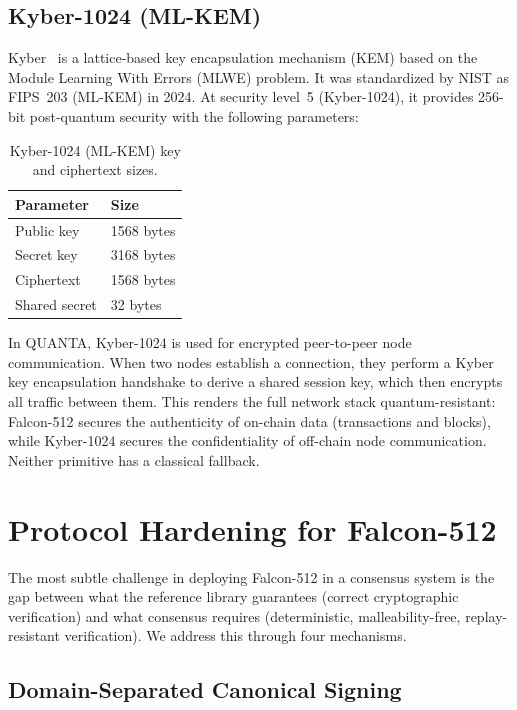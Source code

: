 \documentclass[11pt,a4paper]{article}
\begin{document}
\subsection{Kyber-1024 (ML-KEM)}
\label{subsec:kyber}

Kyber~\cite{fips203} is a lattice-based key encapsulation mechanism (KEM)
based on the Module Learning With Errors (MLWE) problem. It was standardized
by NIST as FIPS~203 (ML-KEM) in 2024. At security level~5 (Kyber-1024),
it provides 256-bit post-quantum security with the following parameters:

\begin{table}[h]
\centering
\begin{tabular}{@{}ll@{}}
\toprule
\textbf{Parameter} & \textbf{Size} \\
\midrule
Public key  & 1568 bytes \\
Secret key  & 3168 bytes \\
Ciphertext  & 1568 bytes \\
Shared secret & 32 bytes \\
\bottomrule
\end{tabular}
\caption{Kyber-1024 (ML-KEM) key and ciphertext sizes.}
\end{table}

In QUANTA, Kyber-1024 is used for encrypted peer-to-peer node communication.
When two nodes establish a connection, they perform a Kyber key encapsulation
handshake to derive a shared session key, which then encrypts all traffic
between them. This renders the full network stack quantum-resistant: Falcon-512
secures the authenticity of on-chain data (transactions and blocks), while
Kyber-1024 secures the confidentiality of off-chain node communication.
Neither primitive has a classical fallback.

\section{Protocol Hardening for Falcon-512}
\label{sec:hardening}

The most subtle challenge in deploying Falcon-512 in a consensus system is the
gap between what the reference library guarantees (correct cryptographic
verification) and what consensus requires (deterministic, malleability-free,
replay-resistant verification). We address this through four mechanisms.

\subsection{Domain-Separated Canonical Signing}
\end{document}

